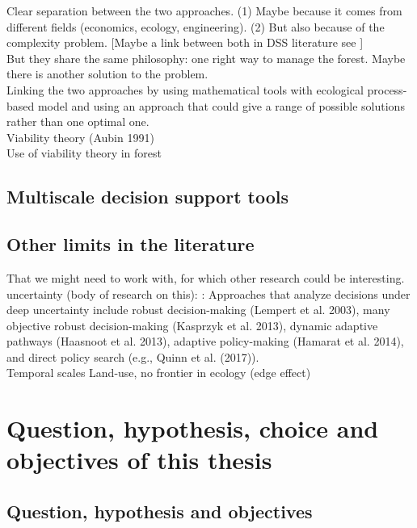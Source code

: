 \documentclass{article}
\begin{document}
Clear separation between the two approaches. (1) Maybe because it comes from different fields (economics, ecology, engineering). (2) But also because of the complexity problem. [Maybe a link between both in DSS literature see \cite{vacikCurrentFutureDrivers2014}] \\
But they share the same philosophy: one right way to manage the forest. Maybe there is another solution to the problem. \\
Linking the two approaches by using mathematical tools with ecological process-based model and using an approach that could give a range of possible solutions rather than one optimal one. \\
Viability theory (Aubin 1991) \\
Use of viability theory in forest \cite{mathiasUsingViabilityTheory2015, mathiasMultilevelPoliciesAdaptive2017, pichancourtBridgingOstromsGovernance2024}

\subsection{Multiscale decision support tools}

\subsection{Other limits in the literature}
That we might need to work with, for which other research could be interesting. \\
uncertainty (body of research on this): \cite{radkeIdentifyingDecisionrelevantUncertainties2020}: Approaches that analyze decisions under deep uncertainty include robust decision-making (Lempert et al. 2003), many objective robust decision-making (Kasprzyk et al. 2013), dynamic adaptive pathways (Haasnoot et al. 2013), adaptive policy-making (Hamarat et al. 2014), and direct policy search (e.g., Quinn et al. (2017)). \cite{depellegrinllorenteRecognizingUncertaintyForest2022} \\
Temporal scales \cite{chaveProblemPatternScale2013}
Land-use, no frontier in ecology (edge effect)

\section{Question, hypothesis, choice and objectives of this thesis}

\subsection{Question, hypothesis and objectives}
\end{document}
